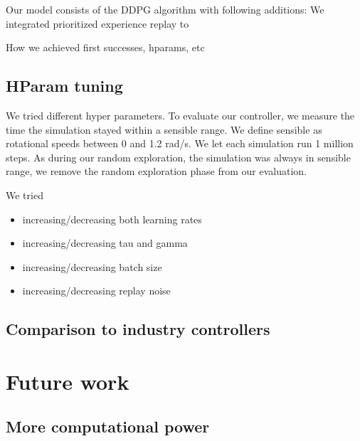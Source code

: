 \documentclass[hyperref,german,beleg]{cgvpub}
\begin{document}
Our model consists of the DDPG algorithm with following additions:
We integrated prioritized experience replay to

How we achieved first successes, hparams, etc

\section{HParam tuning}
We tried different hyper parameters. To evaluate our controller, we measure the time the simulation stayed within a sensible range. We define sensible as rotational speeds between 0 and 1.2 rad/s. We let each simulation run 1 million steps. As during our random exploration, the simulation was always in sensible range, we remove the random exploration phase from our evaluation.

We tried
\begin{itemize} 
  \item increasing/decreasing both learning rates
  \item increasing/decreasing tau and gamma
  \item increasing/decreasing batch size
  \item increasing/decreasing replay noise
\end{itemize}



\section{Comparison to industry controllers}




\chapter{Future work}

\section{More computational power}
\end{document}
